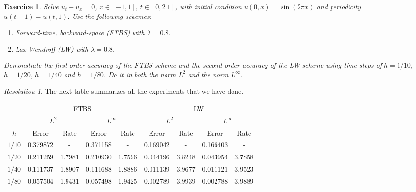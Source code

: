 \documentclass[10pt,a4paper]{article}
\newtheorem{exercici}{Exercice}
\theoremstyle{definition}
\theoremstyle{remark}
\newtheorem*{res}{Resolution}
\begin{document}
\begin{exercici}
  Solve $u_t+u_x=0$, $x\in[-1,1]$, $t\in[0,2.1]$, with initial condition $u(0,x)=\sin(2\pi x)$ and periodicity $u(t,-1)=u(t,1)$. Use the following schemes:
  \begin{enumerate}
    \item Forward-time, backward-space (FTBS) with $\lambda =0.8$.
    \item Lax-Wendroff (LW) with $\lambda =0.8$.
  \end{enumerate}
  Demonstrate the first-order accuracy of the FTBS scheme and the second-order accuracy of the LW scheme using time steps of $h=1/10$, $h=1/20$, $h=1/40$ and $h=1/80$. Do it in both the norm $L^2$ and the norm $L^\infty$.
\end{exercici}
\begin{res}
  The next table summarizes all the experiments that we have done.
  \begin{table}[ht]
    \centering
    \begin{tabular}{|c|c|c|c|c||c|c|c|c|}
      \hline
             & \multicolumn{4}{c||}{FTBS} & \multicolumn{4}{c|}{LW}                                                                                                                 \\
      \cline{2-9}
             & \multicolumn{2}{c|}{$L^2$} & \multicolumn{2}{c||}{$L^\infty$} & \multicolumn{2}{c|}{$L^2$} & \multicolumn{2}{c|}{$L^\infty$}                                         \\
      \cline{2-9}
      $h$    & Error                      & Rate                             & Error                      & Rate                            & Error    & Rate   & Error    & Rate   \\
      \hline\hline
      $1/10$ & 0.379872                   & -                                & 0.371158                   & -                               & 0.169042 & -      & 0.166403 & -      \\
      $1/20$ & 0.211259                   & 1.7981                           & 0.210930                   & 1.7596                          & 0.044196 & 3.8248 & 0.043954 & 3.7858 \\
      $1/40$ & 0.111737                   & 1.8907                           & 0.111688                   & 1.8886                          & 0.011139 & 3.9677 & 0.011121 & 3.9523 \\
      $1/80$ & 0.057504                   & 1.9431                           & 0.057498                   & 1.9425                          & 0.002789 & 3.9939 & 0.002788 & 3.9889 \\

\end{tabular}
\end{table}
\end{res}
\end{document}
